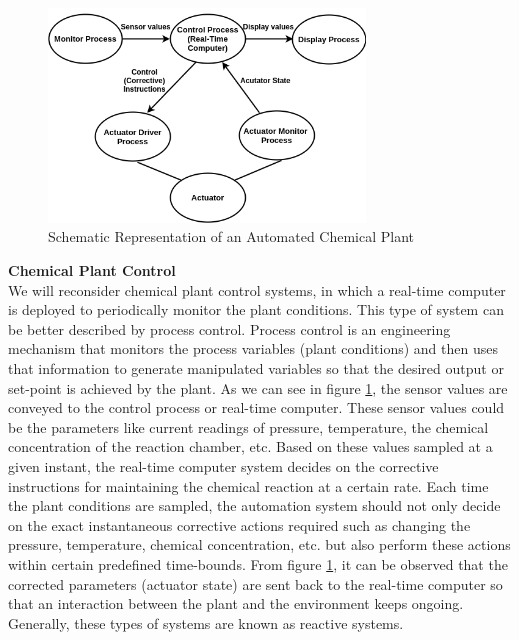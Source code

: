 \documentclass[12pt]{report}
\begin{document}
\begin{figure}[h]
    \centering
    \includegraphics[width=0.75\textwidth]{images/chem.png}
    \caption{Schematic Representation of an Automated Chemical Plant}
    \label{fig:chem}
\end{figure}

\noindent \textbf{Chemical Plant Control}\\
We will reconsider chemical plant control systems, in which a real-time computer is deployed to periodically monitor the plant conditions. This type of system can be better described by process control. Process control is an engineering mechanism that monitors the process variables (plant conditions) and then uses that information to generate manipulated variables so that the desired output or set-point is achieved by the plant. As we can see in figure \ref{fig:chem}, the sensor values are conveyed to the control process or real-time computer. These sensor values could be the parameters like current readings of pressure, temperature, the chemical concentration of the reaction chamber, etc. Based on these values sampled at a given instant, the real-time computer system decides on the corrective instructions for maintaining the chemical reaction at a certain rate. Each time the plant conditions are sampled, the automation system should not only decide on the exact instantaneous corrective actions required such as changing the pressure, temperature, chemical concentration, etc. but also perform these actions within certain predefined time-bounds. From figure \ref{fig:chem}, it can be observed that the corrected parameters (actuator state) are sent back to the real-time computer so that an interaction between the plant and the environment keeps ongoing. Generally, these types of systems are known as reactive systems.  \\
\end{document}
